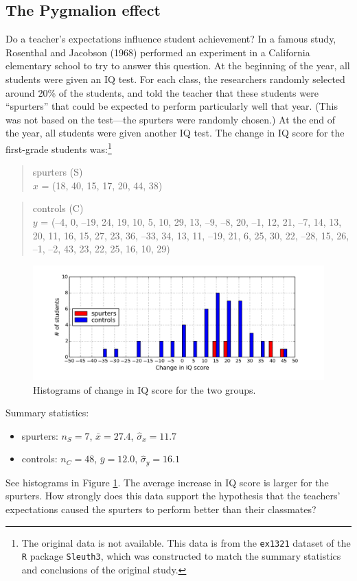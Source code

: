 \documentclass[12pt]{article}
\begin{document}
\subsection{The Pygmalion effect}
\label{section:Pygmalion}

Do a teacher's expectations influence student achievement? In a famous study, Rosenthal and Jacobson (1968) performed an experiment in a California elementary school to try to answer this question. At the beginning of the year, all students were given an IQ test.  For each class, the researchers randomly selected around 20\% of the students, and told the teacher that these students were ``spurters'' that could be expected to perform particularly well that year. (This was not based on the test---the spurters were randomly chosen.) At the end of the year, all students were given another IQ test. 
The change in IQ score for the first-grade students was:\footnote{The original data is not available. This data is from the \texttt{ex1321} dataset of the \texttt{R} package \texttt{Sleuth3}, which was constructed to match the summary statistics and conclusions of the original study.}
\begin{quote}
spurters (S)\\
$x$ = (18, 40, 15, 17, 20, 44, 38)
\end{quote}
\begin{quote}
controls (C)\\
$y$ = (--4, 0, --19, 24, 19, 10, 5, 10, 29, 13, --9, --8, 20, --1, 12, 21, --7, 14,
     13, 20, 11, 16, 15, 27, 23, 36, --33, 34, 13, 11, --19, 21, 6, 25, 30,
     22, --28, 15, 26, --1, --2, 43, 23, 22, 25, 16, 10, 29)
\end{quote}

\begin{figure}
  \begin{center}
    \includegraphics[width=1\textwidth]{pygmalion-histogram.png}
  \end{center}
  \caption{Histograms of change in IQ score for the two groups.}
  \label{figure:pygmalion-histogram}
\end{figure}
Summary statistics:
\begin{itemize}
\item spurters: $n_S = 7$, $\bar x = 27.4$, $\hat\sigma_x = 11.7$
\item controls: $n_C = 48$, $\bar y = 12.0$, $\hat\sigma_y = 16.1$
\end{itemize}
See histograms in Figure \ref{figure:pygmalion-histogram}. The average increase in IQ score is larger for the spurters.  How strongly does this data support the hypothesis that the teachers' expectations caused the spurters to perform better than their classmates? 
\end{document}
